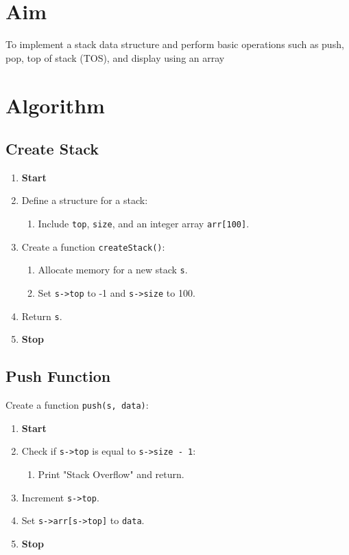 
\section{Aim}
To implement a stack data structure and perform basic operations such as push, pop, top of stack (TOS), and display using an array


\section{Algorithm}
 {\selectfont

  \subsection{Create Stack}
  \begin{enumerate}[label=\arabic*:,left=0pt]
    \item \textbf{Start}

    \item Define a structure for a stack:
          \begin{enumerate}[label=2.\arabic*.]
            \item Include \texttt{top}, \texttt{size}, and an integer array \texttt{arr[100]}.
          \end{enumerate}

    \item Create a function \texttt{createStack()}:
          \begin{enumerate}[label=3.\arabic*.]
            \item Allocate memory for a new stack \texttt{s}.
            \item Set \texttt{s->top} to -1 and \texttt{s->size} to 100.
          \end{enumerate}
    \item Return \texttt{s}.
    \item \textbf{Stop}
  \end{enumerate}

  \subsection{Push Function}
  Create a function \texttt{push(s, data)}:
  \begin{enumerate}
    \item \textbf{Start}
    \item Check if \texttt{s->top} is equal to \texttt{s->size - 1}:
          \begin{enumerate}[label=2.\arabic*.]
            \item Print "Stack Overflow" and return.
          \end{enumerate}
    \item Increment \texttt{s->top}.
    \item Set \texttt{s->arr[s->top]} to \texttt{data}.
    \item \textbf{Stop}
  \end{enumerate}

}

